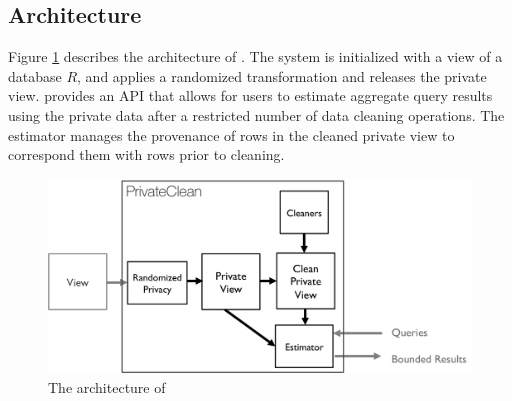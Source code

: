 \subsection{Architecture}
Figure \ref{architecture} describes the architecture of \sys.
The system is initialized with a view of a database $R$, and \sys applies a randomized transformation and releases the private view.
\sys provides an API that allows for users to estimate aggregate query results using the private data after a restricted number of data cleaning operations.
The estimator manages the provenance of rows in the cleaned private view to correspond them with rows prior to cleaning.

\begin{figure}[t]
\centering
 \includegraphics[width=\columnwidth]{figs/architecture.png}
 \caption{The architecture of \sys \label{architecture}}
\end{figure}
